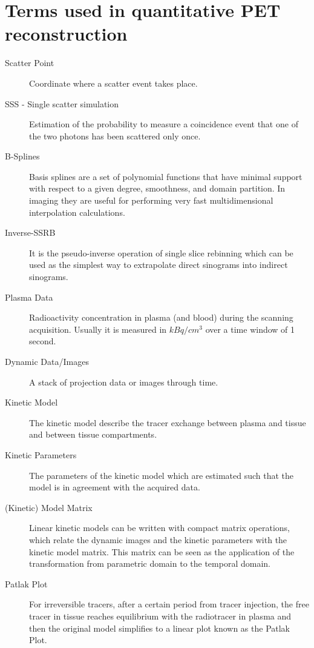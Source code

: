 \documentclass{article}
\begin{document}
\section*{Terms used in quantitative PET reconstruction}
\begin{description}

\item[Scatter Point]
Coordinate where a scatter event takes place. 

\item[SSS - Single scatter simulation]
Estimation of the probability to measure a coincidence event that one of
the two photons has been scattered only once. 

\item[B-Splines]
Basis splines are a set of polynomial functions that have minimal support with 
respect to a given degree, smoothness, and domain partition. In imaging they 
are useful for performing very fast multidimensional interpolation calculations.


\item[Inverse-SSRB]
It is the pseudo-inverse operation of single slice rebinning which can be used 
as the simplest way to extrapolate direct sinograms into indirect sinograms. 

\item[Plasma Data]
Radioactivity concentration in plasma (and blood) during the scanning acquisition.
Usually it is measured in $\mathit{kBq/cm^3}$ over a time window of 1 second. 

\item[Dynamic Data/Images]
A stack of projection data or images through time.

\item[Kinetic Model]
The kinetic model describe the tracer exchange between plasma and tissue 
and between tissue compartments.

\item[Kinetic Parameters]
The parameters of the kinetic model which are estimated such that 
the model is in agreement with the acquired data. 

\item[(Kinetic) Model Matrix]
Linear kinetic models can be written with compact matrix operations, which 
relate the dynamic images and the kinetic parameters with the kinetic model matrix. 
This matrix can be seen as the application of the transformation from parametric 
domain to the temporal domain. 

\item[Patlak Plot]
For irreversible tracers, after a certain period from tracer injection, 
the free tracer in tissue reaches equilibrium with the radiotracer in plasma and 
then the original model simplifies to a linear plot known as the Patlak Plot.


\end{description}
\end{document}

